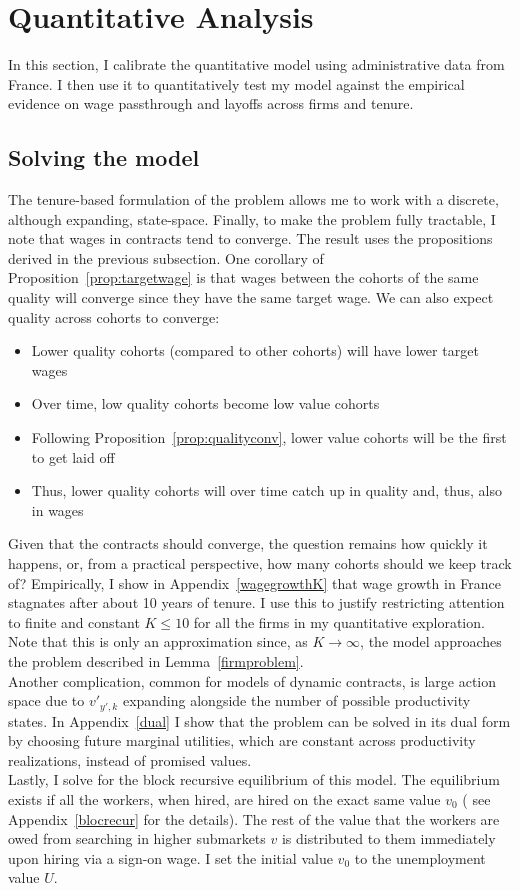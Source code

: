 \section{Quantitative Analysis}
In this section, I calibrate the quantitative model using administrative data from France. I then use it to quantitatively test my model against the empirical evidence on wage passthrough and layoffs across firms and tenure.
\subsection{Solving the model}
The tenure-based formulation of the problem allows me to work with a discrete, although expanding, state-space. Finally, to make the problem fully tractable, I note that wages in contracts tend to converge. The result uses the propositions derived in the previous subsection.
One corollary of Proposition~\ref{prop:targetwage} is that wages between the cohorts of the same quality will converge since they have the same target wage. We can also expect quality across cohorts to converge:
\begin{itemize}
    \item Lower quality cohorts (compared to other cohorts) will have lower target wages
    \item Over time, low quality cohorts become low value cohorts
    \item Following Proposition~\ref{prop:qualityconv}, lower value cohorts will be the first to get laid off
    \item Thus, lower quality cohorts will over time catch up in quality and, thus, also in wages
\end{itemize}
Given that the contracts should converge, the question remains how quickly it happens, or, from a practical perspective, how many cohorts should we keep track of? Empirically, I show in Appendix~\ref{wagegrowthK} that wage growth in France stagnates after about 10 years of tenure.  I use this to justify restricting attention to finite and constant $K\leq 10$ for all the firms in my quantitative exploration. Note that this is only an approximation since, as $K\rightarrow\infty$, the model approaches the problem described in Lemma~\ref{firmproblem}. \\
Another complication, common for models of dynamic contracts, is large action space due to $v'_{y',k}$ expanding alongside the number of possible productivity states. In Appendix~\ref{dual} I show that the problem can be solved in its dual form by choosing future marginal utilities, which are constant across productivity realizations, instead of promised values.
\\
Lastly, I solve for the block recursive equilibrium of this model. The equilibrium exists if all the workers, when hired, are hired on the exact same value $v_0$ ( see Appendix~\ref{blocrecur} for the details). The rest of the value that the workers are owed from searching in higher submarkets $v$ is distributed to them immediately upon hiring via a sign-on wage. I set the initial value $v_0$ to the unemployment value $U$.
